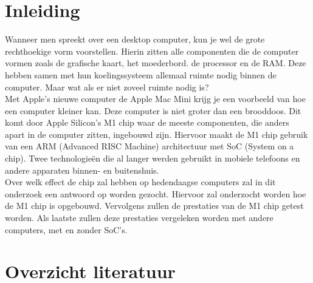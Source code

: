 \documentclass{hogent-article}
\affiliation{
    \textsuperscript{1} \href{mailto:jona.deneve.@student.hogent.be}{jona.deneve.@student.hogent.be}
}
\begin{document}
\flushbottom %
\maketitle %
    \tableofcontents %
\thispagestyle{empty} %


\section{Inleiding}


Wanneer men spreekt over een desktop computer, kun je wel de grote rechthoekige vorm voorstellen. Hierin zitten alle componenten die de computer vormen zoals de grafische kaart, het moederbord. de processor en de RAM. Deze hebben samen met hun koelingssysteem allemaal ruimte nodig binnen de computer. Maar wat als er niet zoveel ruimte nodig is? \\
Met Apple's nieuwe computer de Apple Mac Mini krijg je een voorbeeld van hoe een computer kleiner kan. Deze computer is niet groter dan een brooddoos. Dit komt door Apple Silicon's M1 chip waar de meeste componenten, die anders apart in de computer zitten, ingebouwd zijn. Hiervoor maakt de M1 chip gebruik van een ARM (Advanced RISC Machine) architectuur met SoC (System on a chip). Twee technologieën die al langer werden gebruikt in mobiele telefoons en andere apparaten binnen- en buitenshuis. \\
Over welk effect de chip zal hebben op hedendaagse computers zal in dit onderzoek een antwoord op worden gezocht. Hiervoor zal onderzocht worden hoe de M1 chip is opgebouwd. Vervolgens zullen de prestaties van de M1 chip getest worden. Als laatste zullen deze prestaties vergeleken worden met andere computers, met en zonder SoC's.

\section{Overzicht literatuur}
\end{document}
